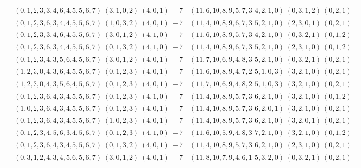 \documentclass[11pt]{article}
\begin{document}
\begin{longtable}[l]{|c|c|c|}
 \cline{2-3} 
 & $(0 ,1 ,2 ,3 ,3 ,4 ,6 ,4 ,5 ,5 ,6 ,7) \;(3 ,1 ,0 ,2) \;(4 ,0 ,1) \;-7$ & $(11 ,6 ,10 ,8 ,9 ,5 ,7 ,3 ,4 ,2 ,1 ,0) \;(0 ,3 ,1 ,2) \;(0 ,2 ,1) \;$\\ 
 \cline{2-3} 
 & $(0 ,1 ,2 ,3 ,6 ,3 ,4 ,4 ,5 ,5 ,6 ,7) \;(1 ,0 ,3 ,2) \;(4 ,0 ,1) \;-7$ & $(11 ,4 ,10 ,8 ,9 ,6 ,7 ,3 ,5 ,2 ,1 ,0) \;(2 ,3 ,0 ,1) \;(0 ,2 ,1) \;$\\ 
 \cline{2-3} 
 & $(0 ,1 ,2 ,3 ,3 ,4 ,6 ,4 ,5 ,5 ,6 ,7) \;(3 ,0 ,1 ,2) \;(4 ,1 ,0) \;-7$ & $(11 ,6 ,10 ,8 ,9 ,5 ,7 ,3 ,4 ,2 ,1 ,0) \;(0 ,3 ,2 ,1) \;(0 ,1 ,2) \;$\\ 
 \cline{2-3} 
 & $(0 ,1 ,2 ,3 ,6 ,3 ,4 ,4 ,5 ,5 ,6 ,7) \;(0 ,1 ,3 ,2) \;(4 ,1 ,0) \;-7$ & $(11 ,4 ,10 ,8 ,9 ,6 ,7 ,3 ,5 ,2 ,1 ,0) \;(2 ,3 ,1 ,0) \;(0 ,1 ,2) \;$\\ 
 \cline{2-3} 
 & $(0 ,1 ,2 ,3 ,4 ,3 ,5 ,6 ,4 ,5 ,6 ,7) \;(3 ,0 ,1 ,2) \;(4 ,0 ,1) \;-7$ & $(11 ,7 ,10 ,6 ,9 ,4 ,8 ,3 ,5 ,2 ,1 ,0) \;(0 ,3 ,2 ,1) \;(0 ,2 ,1) \;$\\ 
 \cline{2-3} 
 & $(1 ,2 ,3 ,0 ,4 ,3 ,6 ,4 ,5 ,5 ,6 ,7) \;(0 ,1 ,2 ,3) \;(4 ,0 ,1) \;-7$ & $(11 ,6 ,10 ,8 ,9 ,4 ,7 ,2 ,5 ,1 ,0 ,3) \;(3 ,2 ,1 ,0) \;(0 ,2 ,1) \;$\\ 
 \cline{2-3} 
 & $(1 ,2 ,3 ,0 ,4 ,3 ,5 ,6 ,4 ,5 ,6 ,7) \;(0 ,1 ,2 ,3) \;(4 ,0 ,1) \;-7$ & $(11 ,7 ,10 ,6 ,9 ,4 ,8 ,2 ,5 ,1 ,0 ,3) \;(3 ,2 ,1 ,0) \;(0 ,2 ,1) \;$\\ 
 \cline{2-3} 
 & $(0 ,1 ,2 ,3 ,6 ,4 ,3 ,4 ,5 ,5 ,6 ,7) \;(0 ,1 ,2 ,3) \;(4 ,1 ,0) \;-7$ & $(11 ,4 ,10 ,8 ,9 ,5 ,7 ,3 ,6 ,2 ,1 ,0) \;(3 ,2 ,1 ,0) \;(0 ,1 ,2) \;$\\ 
 \cline{2-3} 
 & $(1 ,0 ,2 ,3 ,6 ,4 ,3 ,4 ,5 ,5 ,6 ,7) \;(0 ,1 ,2 ,3) \;(4 ,0 ,1) \;-7$ & $(11 ,4 ,10 ,8 ,9 ,5 ,7 ,3 ,6 ,2 ,0 ,1) \;(3 ,2 ,1 ,0) \;(0 ,2 ,1) \;$\\ 
 \cline{2-3} 
 & $(0 ,1 ,2 ,3 ,6 ,4 ,3 ,4 ,5 ,5 ,6 ,7) \;(1 ,0 ,2 ,3) \;(4 ,0 ,1) \;-7$ & $(11 ,4 ,10 ,8 ,9 ,5 ,7 ,3 ,6 ,2 ,1 ,0) \;(3 ,2 ,0 ,1) \;(0 ,2 ,1) \;$\\ 
 \cline{2-3} 
 & $(0 ,1 ,2 ,3 ,4 ,5 ,6 ,3 ,4 ,5 ,6 ,7) \;(0 ,1 ,2 ,3) \;(4 ,1 ,0) \;-7$ & $(11 ,6 ,10 ,5 ,9 ,4 ,8 ,3 ,7 ,2 ,1 ,0) \;(3 ,2 ,1 ,0) \;(0 ,1 ,2) \;$\\ 
 \cline{2-3} 
 & $(0 ,1 ,2 ,3 ,6 ,4 ,3 ,4 ,5 ,5 ,6 ,7) \;(0 ,1 ,3 ,2) \;(4 ,0 ,1) \;-7$ & $(11 ,4 ,10 ,8 ,9 ,5 ,7 ,3 ,6 ,2 ,1 ,0) \;(2 ,3 ,1 ,0) \;(0 ,2 ,1) \;$\\ 
 \cline{2-3} 
 & $(0 ,3 ,1 ,2 ,4 ,3 ,4 ,5 ,6 ,5 ,6 ,7) \;(3 ,0 ,1 ,2) \;(4 ,0 ,1) \;-7$ & $(11 ,8 ,10 ,7 ,9 ,4 ,6 ,1 ,5 ,3 ,2 ,0) \;(0 ,3 ,2 ,1) \;(0 ,2 ,1) \;$\\ 

\end{longtable}
\end{document}
